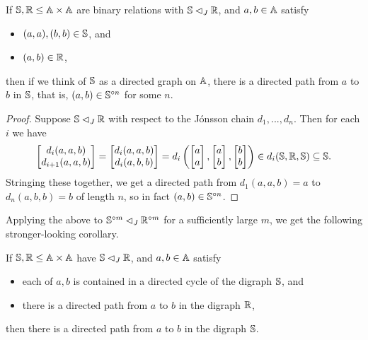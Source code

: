 \documentclass[letterpaper,11pt]{article}
\begin{document}
\begin{thm}\label{absorbing-directed-path} If $\mathbb{S}, \mathbb{R} \le \mathbb{A} \times \mathbb{A}$ are binary relations with $\mathbb{S} \lhd_J \mathbb{R}$, and $a,b \in \mathbb{A}$ satisfy
\begin{itemize}
\item $(a,a), (b,b) \in \mathbb{S}$, and

\item $(a,b) \in \mathbb{R}$,
\end{itemize}
then if we think of $\mathbb{S}$ as a directed graph on $\mathbb{A}$, there is a directed path from $a$ to $b$ in $\mathbb{S}$, that is, $(a,b) \in \mathbb{S}^{\circ n}$ for some $n$.
\end{thm}
\begin{proof} Suppose $\mathbb{S} \lhd_J \mathbb{R}$ with respect to the J\'onsson chain $d_1, ..., d_n$. Then for each $i$ we have
\[
\begin{bmatrix} d_i(a,a,b)\\ d_{i+1}(a,a,b) \end{bmatrix} = \begin{bmatrix} d_i(a,a,b)\\ d_i(a,b,b) \end{bmatrix} = d_i\left(\begin{bmatrix} a\\ a \end{bmatrix}, \begin{bmatrix} a\\ b \end{bmatrix}, \begin{bmatrix} b\\ b \end{bmatrix}\right) \in d_i(\mathbb{S}, \mathbb{R}, \mathbb{S}) \subseteq \mathbb{S}.
\]
Stringing these together, we get a directed path from $d_1(a,a,b) = a$ to $d_n(a,b,b) = b$ of length $n$, so in fact $(a,b) \in \mathbb{S}^{\circ n}$.
\end{proof}

Applying the above to $\mathbb{S}^{\circ m} \lhd_J \mathbb{R}^{\circ m}$ for a sufficiently large $m$, we get the following stronger-looking corollary.

\begin{cor}\label{cor-absorbing-directed-path} If $\mathbb{S}, \mathbb{R} \le \mathbb{A} \times \mathbb{A}$ have $\mathbb{S} \lhd_J \mathbb{R}$, and $a,b \in \mathbb{A}$ satisfy
\begin{itemize}
\item each of $a,b$ is contained in a directed cycle of the digraph $\mathbb{S}$, and

\item there is a directed path from $a$ to $b$ in the digraph $\mathbb{R}$,
\end{itemize}
then there is a directed path from $a$ to $b$ in the digraph $\mathbb{S}$.
\end{cor}
\end{document}
